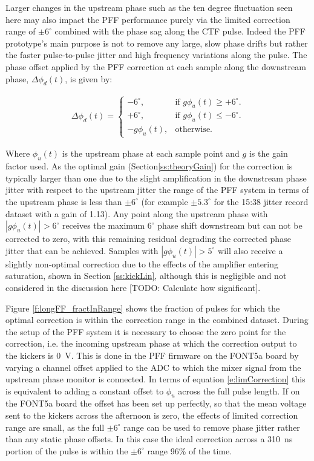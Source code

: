 Larger changes in the upstream phase such as the ten degree fluctuation seen here may also impact the PFF performance purely via the limited correction range of \(\pm6^\circ\) combined with the phase sag along the CTF pulse. Indeed the PFF prototype's main purpose is not to remove any large, slow phase drifts but rather the faster pulse-to-pulse jitter and high frequency variations along the pulse. The phase offset applied by the PFF correction at each sample along the downstream phase, \(\Delta\phi_d(t)\), is given by:

\begin{eqnarray}
	\Delta\phi_d(t) = \begin{cases}
	-6^\circ, &  \text{if $g\phi_u(t) \geq+6^\circ$.}\\
	+6^\circ, &  \text{if $g\phi_u(t)\leq-6^\circ$}.\\
	-g\phi_u(t), &  \text{otherwise.}
	\end{cases}
	\label{e:limCorrection}
\end{eqnarray}

Where \(\phi_u(t)\) is the upstream phase at each sample point and \(g\) is the gain factor used. As the optimal gain (Section\ref{ss:theoryGain}) for the correction is typically larger than one due to the slight amplification in the downstream phase jitter with respect to the upstream jitter the range of the PFF system in terms of the upstream phase is less than \(\pm6^\circ\) (for example \(\pm5.3^\circ\) for the 15:38 jitter record dataset with a gain of 1.13). Any point along the upstream phase with \(|g\phi_u(t)| > 6^\circ\) receives the maximum \(6^\circ\) phase shift downstream but can not be corrected to zero, with this remaining residual degrading the corrected phase jitter that can be achieved. Samples with  \(|g\phi_u(t)| > 5^\circ\) will also receive a slightly non-optimal correction due to the effects of the amplifier entering saturation, shown in Section \ref{ss:kickLin}, although this is negligible and not considered in the discussion here [TODO: Calculate how significant]. 

Figure \ref{f:longFF_fractInRange} shows the fraction of pulses for which the optimal correction is within the correction range in the combined dataset. During the setup of the PFF system it is necessary to choose the zero point for the correction, i.e. the incoming upstream phase at which the correction output to the kickers is 0~V. This is done in the PFF firmware on the FONT5a board by varying a channel offset applied to the ADC to which the mixer signal from the upstream phase monitor is connected. In terms of equation \ref{e:limCorrection} this is equivalent to adding a constant offset to \(\phi_u\) across the full pulse length. If on the FONT5a board the offset has been set up perfectly, so that the mean voltage sent to the kickers across the afternoon is zero, the effects of limited correction range are small, as the full \(\pm6^\circ\) range can be used to remove phase jitter rather than any static phase offsets. In this case the ideal correction across a 310~ns portion of the pulse is within the \(\pm6^\circ\) range 96\% of the time. 

